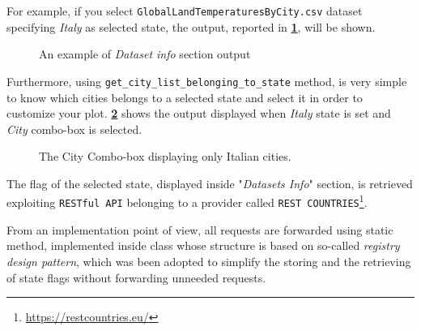 \documentclass[sigconf]{acmart}
\begin{document}
For example, if you select \texttt{GlobalLandTemperaturesByCity.csv} dataset specifying \textit{Italy} as selected state, the output, reported in \textbf{\cref{DatasetInfo}}, will be shown. 

\begin{figure}
    \caption{An example of \textit{Dataset info} section output}%
    \label{DatasetInfo}%
\end{figure}

Furthermore, using \texttt{get\_city\_list\_belonging\_to\_state} method, is very simple to know which cities belongs to a selected state and select it in order to customize your plot. \textbf{\cref{ItalianCombobox}} shows the output displayed when \textit{Italy} state is set and \textit{City} combo-box is selected.

\begin{figure}[h]
    \caption{The City Combo-box displaying only Italian cities.}%
    \label{ItalianCombobox}%
\end{figure}

The flag of the selected state, displayed inside "\textit{Datasets Info}" section, is retrieved exploiting \texttt{RESTful API} belonging to a provider called \texttt{REST COUNTRIES}\footnote{\url{https://restcountries.eu/}}. 

From an implementation point of view, all requests are forwarded using  static method, implemented inside  class whose structure is based on so-called \textit{registry design pattern}, which was been adopted to simplify the storing and the retrieving of state flags without forwarding unneeded requests.
\end{document}

